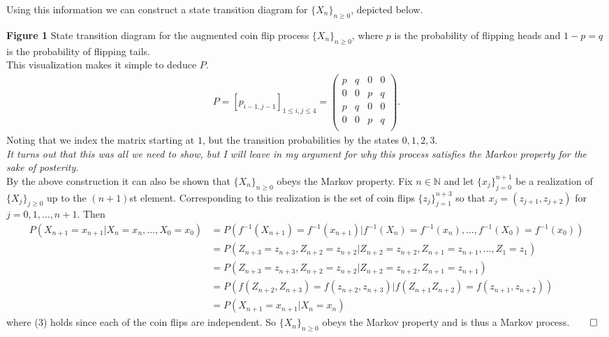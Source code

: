 \documentclass[11pt, letterpaper]{article}
\newcommand{\mbb}[1]{\mathbb{#1}}
\begin{document}
    Using this information we can construct a state transition diagram for $\{X_n\}_{n\geq 0}$, depicted below.
\begin{center}
\end{center}
{\bf Figure 1} State transition diagram for the augmented coin flip process $\{X_n\}_{n\geq 0}$, where $p$ is the probability of flipping heads and $1-p=q$ is the probability of flipping tails.\\[10pt]
This visualization makes it simple to deduce $P$.
\begin{align*}
    P=[p_{i-1,j-1}]_{1\leq i,j\leq 4}=\begin{pmatrix}
        p & q & 0 & 0 \\
        0 & 0 & p & q \\
        p & q & 0 & 0 \\
        0 & 0 & p & q \\
    \end{pmatrix}.
\end{align*}
Noting that we index the matrix starting at $1$, but the transition probabilities by the states $0,1,2,3$.\\[10pt]
{\it It turns out that this was all we need to show, but I will leave in my argument for why this process satisfies the Markov property for the sake of posterity.}\\[10pt]
By the above construction it can also be shown that $\{X_n\}_{n\geq 0}$ obeys the Markov property. Fix $n\in\mbb{N}$ and let $\{x_j\}_{j=0}^{n+1}$ be a realization of $\{X_j\}_{j\geq 0}$ up to the $(n+1)$st element. Corresponding to this
realization is the set of coin flips $\{z_j\}_{j=1}^{n+3}$ so that $x_j=(z_{j+1},z_{j+2})$ for $j=0,1,\dots,n+1$. Then
\begin{align*}
    P(X_{n+1}=x_{n+1}|X_n=x_{n},\dots,X_0=x_0)&=P(f^{-1}(X_{n+1})=f^{-1}(x_{n+1})|f^{-1}(X_n)=f^{-1}(x_{n}),\dots,f^{-1}(X_0)=f^{-1}(x_0))\\
    &=P(Z_{n+3}=z_{n+3},Z_{n+2}=z_{n+2}|Z_{n+2}=z_{n+2},Z_{n+1}=z_{n+1},\dots,Z_1=z_1)\\
    &=P(Z_{n+3}=z_{n+3},Z_{n+2}=z_{n+2}|Z_{n+2}=z_{n+2},Z_{n+1}=z_{n+1})\tag{3}\\
    &=P(f(Z_{n+2},Z_{n+3})=f(z_{n+2},z_{n+3})|f(Z_{n+1}Z_{n+2})=f(z_{n+1},z_{n+2}))\\
    &=P(X_{n+1}=x_{n+1}|X_n=x_n)
\end{align*}
where (3) holds since each of the coin flips are independent. So $\{X_n\}_{n\geq 0}$ obeys the Markov property and is thus a Markov process.\hfill{$\qed$}\\[10pt]
\end{document}
